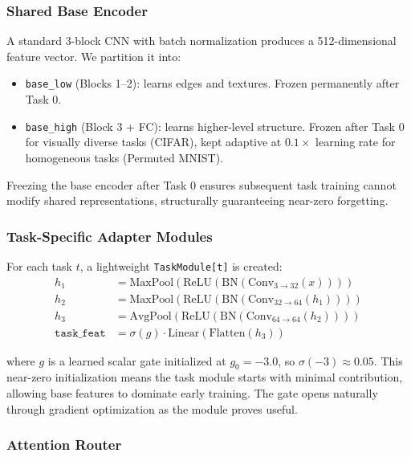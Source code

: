 \documentclass[10pt,twocolumn]{article}
\begin{document}
\subsubsection{Shared Base Encoder}

A standard 3-block CNN with batch normalization produces a 512-dimensional feature vector. We partition it into:

\begin{itemize}
    \item \texttt{base\_low} (Blocks 1--2): learns edges and textures. Frozen permanently after Task 0.
    \item \texttt{base\_high} (Block 3 + FC): learns higher-level structure. Frozen after Task 0 for visually diverse tasks (CIFAR), kept adaptive at $0.1\times$ learning rate for homogeneous tasks (Permuted MNIST).
\end{itemize}

Freezing the base encoder after Task 0 ensures subsequent task training cannot modify shared representations, structurally guaranteeing near-zero forgetting.

\subsubsection{Task-Specific Adapter Modules}

For each task $t$, a lightweight \texttt{TaskModule[t]} is created:
\begin{align*}
h_1 &= \text{MaxPool}(\text{ReLU}(\text{BN}(\text{Conv}_{3\to32}(x)))) \\
h_2 &= \text{MaxPool}(\text{ReLU}(\text{BN}(\text{Conv}_{32\to64}(h_1)))) \\
h_3 &= \text{AvgPool}(\text{ReLU}(\text{BN}(\text{Conv}_{64\to64}(h_2)))) \\
\texttt{task\_feat} &= \sigma(g) \cdot \text{Linear}(\text{Flatten}(h_3))
\end{align*}

where $g$ is a learned scalar gate initialized at $g_0 = -3.0$, so $\sigma(-3) \approx 0.05$. This near-zero initialization means the task module starts with minimal contribution, allowing base features to dominate early training. The gate opens naturally through gradient optimization as the module proves useful.

\subsubsection{Attention Router}
\end{document}

